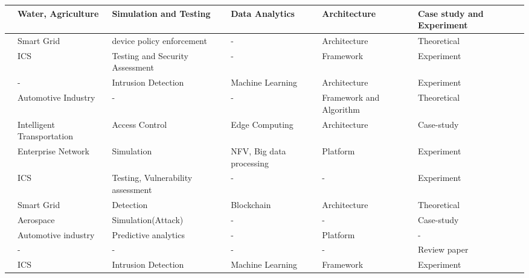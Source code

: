 \begin{table}[H]
\begin{NiceTabular}{p{0.5cm}|p{3cm}|p{2.5cm}|p{2cm}|p{3cm}|p{1.5cm}}
    \cite{maillet-contozEndtoendSecurityValidation2020} & Water, Agriculture & Simulation and Testing & Data Analytics & Architecture & Case study and Experiment \\
    \hline

    \cite{giovannipaolosellittoEnablingZeroTrust2021} & Smart Grid & device policy enforcement & - & Architecture & Theoretical \\
    \hline

    \cite{dietzEmployingDigitalTwins2022} & ICS & Testing and Security Assessment & - & Framework & Experiment \\
    \hline

    \cite{sousaELEGANTSecurityCritical2021} & - & Intrusion Detection & Machine Learning & Architecture & Experiment \\
    \hline

    \cite{xuEfficientAuthenticationVehicular2021} & Automotive Industry & - & - & Framework and Algorithm & Theoretical \\
    \hline

   \cite{glenandbensonjamesandguptamaanakandsandhuravicatheyEdgeCentricSecure2021} & Intelligent Transportation & Access Control & Edge Computing & Architecture & Case-study \\
   \hline

   \cite{wangDTCPNDigitalTwin2022} & Enterprise Network & Simulation & NFV, Big data processing & Platform & Experiment \\
   \hline

   \cite{franciaDigitalTwinsIndustrial2021} & ICS & Testing, Vulnerability assessment & - & - & Experiment \\
   \hline

   \cite{lopezDIGITALTWINSINTELLIGENT2021} & Smart Grid & Detection & Blockchain & Architecture & Theoretical \\
    \hline
    
   \cite{adrienbacueDigitalTwinsEnhanced2022} & Aerospace & Simulation(Attack) & - & - & Case-study \\
    \hline
    
   \cite{veledarDigitalTwinsDependability2019} & Automotive industry & Predictive analytics & - & Platform & - \\
   \hline

   \cite{holmesDigitalTwinsCyber2021} & - & - & - & - & Review paper \\
   \hline

   \cite{vargheseDigitalTwinbasedIntrusion2022} & ICS & Intrusion Detection & Machine Learning & Framework & Experiment \\
   \hline


\end{NiceTabular}
\end{table}

